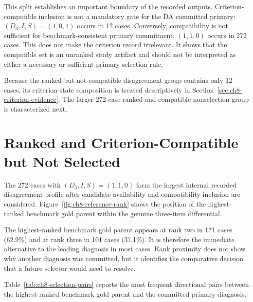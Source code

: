 This split establishes an important boundary of the recorded outputs. Criterion-compatible inclusion is not a mandatory gate for the DA committed primary: $(D_3,I,S)=(1,0,1)$ occurs in 12 cases. Conversely, compatibility is not sufficient for benchmark-consistent primary commitment: $(1,1,0)$ occurs in 272 cases. This does not make the criterion record irrelevant. It shows that the compatible set is an unranked study artifact and should not be interpreted as either a necessary or sufficient primary-selection rule.

Because the ranked-but-not-compatible disagreement group contains only 12 cases, its criterion-state composition is treated descriptively in Section~\ref{sec:ch8-criterion-evidence}. The larger 272-case ranked-and-compatible nonselection group is characterized next.

\section{Ranked and Criterion-Compatible but Not Selected}
\label{sec:ch8-primary-selection}
\label{sec:ch8-selection-signatures}

The 272 cases with $(D_3,I,S)=(1,1,0)$ form the largest internal recorded disagreement profile after candidate availability and compatibility inclusion are considered. Figure~\ref{fig:ch8-reference-rank} shows the position of the highest-ranked benchmark gold parent within the genuine three-item differential.


The highest-ranked benchmark gold parent appears at rank two in 171 cases (62.9\%) and at rank three in 101 cases (37.1\%). It is therefore the immediate alternative to the leading diagnosis in most cases. Rank proximity does not show why another diagnosis was committed, but it identifies the comparative decision that a future selector would need to resolve.

Table~\ref{tab:ch8-selection-pairs} reports the most frequent directional pairs between the highest-ranked benchmark gold parent and the committed primary diagnosis.

